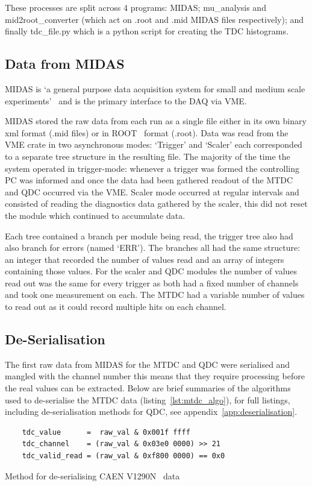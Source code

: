 \documentclass[]{article}
\begin{document}
These processes are split across 4 programs: MIDAS; mu\_analysis and mid2root\_converter (which act on .root and .mid MIDAS files respectively); and finally tdc\_file.py which is a python script for creating the TDC histograms.

\subsection{Data from MIDAS} %
\label{sub:data_from_midas}
MIDAS is `a general purpose data acquisition system for small and medium scale experiments'~\cite{ritt2012midas} and is the primary interface to the DAQ via VME. 

MIDAS stored the raw data from each run as a single file either in its own binary xml format (.mid files) or in ROOT~\cite{Brun199781} format (.root). Data was read from the VME crate in two asynchronous modes: `Trigger' and `Scaler' each corresponded to a separate tree structure in the resulting file. The majority of the time the system operated in trigger-mode: whenever a trigger was formed the controlling PC was informed and once the data had been gathered readout of the MTDC and QDC occurred via the VME. Scaler mode occurred at regular intervals and consisted of reading the diagnostics data gathered by the scaler, this did not reset the module which continued to accumulate data. 

Each tree contained a branch per module being read, the trigger tree also had also branch for errors (named `ERR'). The branches all had the same structure: an integer that recorded the number of values read and an array of integers containing those values. For the scaler and QDC modules the number of values read out was the same for every trigger as both had a fixed number of channels and took one measurement on each. The MTDC had a variable number of values to read out as it could record multiple hits on each channel.
\subsection{De-Serialisation} %
\label{sub:de_serialisation}
The first raw data from MIDAS for the MTDC and QDC were serialised and mangled with the channel number this means that they require processing before the real values can be extracted. Below are brief summaries of the algorithms used to de-serialise the MTDC data (listing~\ref{lst:mtdc_algo}), for full listings, including de-serialisation methods for QDC, see appendix~\ref{app:deserialisation}.
%
\begin{listing}[htbp]
    \begin{verbatim}
    tdc_value      =  raw_val & 0x001f ffff
    tdc_channel    = (raw_val & 0x03e0 0000) >> 21
    tdc_valid_read = (raw_val & 0xf800 0000) == 0x0
    \end{verbatim}
    \caption{Method for de-serialising CAEN V1290N~\cite{CAENV1290N} data}
    \label{lst:mtdc_algo}
\end{listing}
\end{document}
